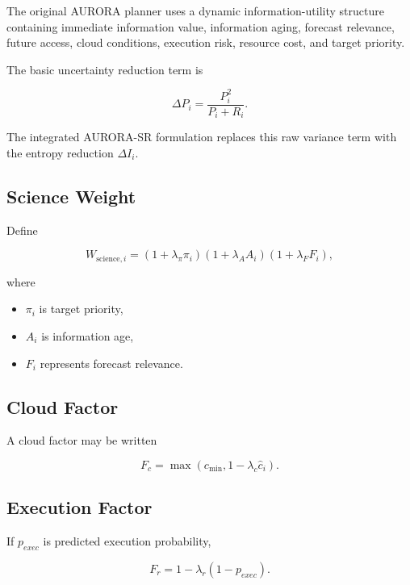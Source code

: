 \documentclass[11pt,a4paper]{article}
\begin{document}
The original AURORA planner uses a dynamic information-utility structure
containing immediate information value, information aging, forecast
relevance, future access, cloud conditions, execution risk, resource
cost, and target priority.

The basic uncertainty reduction term is

\begin{equation}
\Delta P_i
=
\frac{
P_i^2
}{
P_i+R_i
}.
\end{equation}

The integrated AURORA-SR formulation replaces this raw variance term
with the entropy reduction $\Delta I_i$.

\subsection{Science Weight}

Define

\begin{equation}
W_{\mathrm{science},i}
=
(1+\lambda_\pi\pi_i)
(1+\lambda_AA_i)
(1+\lambda_FF_i),
\end{equation}

where

\begin{itemize}
\item $\pi_i$ is target priority,
\item $A_i$ is information age,
\item $F_i$ represents forecast relevance.
\end{itemize}

\subsection{Cloud Factor}

A cloud factor may be written

\begin{equation}
F_c
=
\max
\left(
c_{\min},
1-\lambda_c\hat c_i
\right).
\end{equation}

\subsection{Execution Factor}

If $p_{exec}$ is predicted execution probability,

\begin{equation}
F_r
=
1-\lambda_r(1-p_{exec}).
\end{equation}
\end{document}
